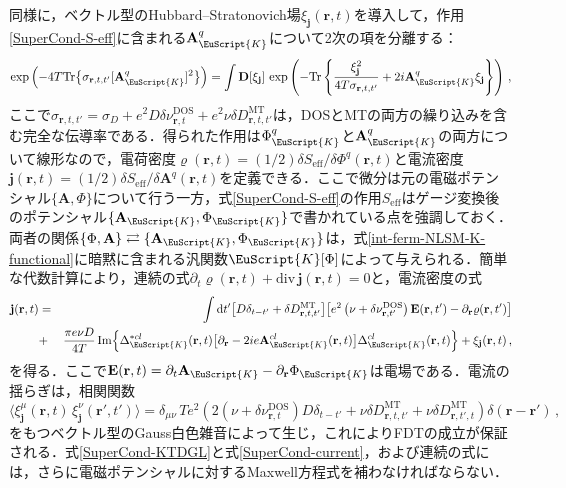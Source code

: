 \documentclass[a4paper,11pt]{ltjsarticle}
\def\Tr{\mathrm{Tr}}
\def\d{\mathrm{d}}
\def\D{\mathbf{D}}
\def\rt{(\mathbf{r},t)}
\begin{document}
同様に，ベクトル型のHubbard--Stratonovich場$\xi_{\mathbf{j}}\rt$を導入して，作用\eqref{SuperCond-S-eff}に含まれる$\mathbf{A}^{q}_{\EuScript{K}}$について2次の項を分離する：
\begin{equation}
\exp\left(-4T\Tr\big\{\sigma_{\mathbf{r},t,t'}
[\mathbf{A}^{q}_{\EuScript{K}}]^{2}\big\}\right)=\int\D[\xi_{\mathbf{j}}]\,
\exp\left(-\Tr\left\{\frac{\xi^{2}_{\mathbf{j}}}{4T\sigma_{\mathbf{r},t,t'}}
+2i\mathbf{A}^{q}_{\EuScript{K}}\xi_{\mathbf{j}}\right\}\right)\,,
\end{equation}
ここで$\sigma_{\mathbf{r},t,t'}=\sigma_{D}+e^{2}D\delta\nu^{\mathrm{DOS}}_{\mathbf{r},t}+e^{2}\nu\delta D^{\mathrm{MT}}_{\mathbf{r},t,t'}$は，DOSとMTの両方の繰り込みを含む完全な伝導率である．得られた作用は$\Phi^{q}_{\EuScript{K}}$と$\mathbf{A}^{q}_{\EuScript{K}}$の両方について線形なので，電荷密度$\varrho\rt=(1/2)\delta S_{\mathrm{eff}}/\delta\Phi^{q}\rt$と電流密度$\mathbf{j}\rt=(1/2)\delta S_{\mathrm{eff}}/\delta\mathbf{A}^{q}\rt$を定義できる．ここで微分は元の電磁ポテンシャル$\{\mathbf{A},\Phi\}$について行う一方，式\eqref{SuperCond-S-eff}の作用$S_{\mathrm{eff}}$はゲージ変換後のポテンシャル$\{\mathbf{A}_{\EuScript{K}},\Phi_{\EuScript{K}}\}$で書かれている点を強調しておく．両者の関係$\{\Phi,\mathbf{A}\}\rightleftarrows\{\mathbf{A}_{\EuScript{K}},\Phi_{\EuScript{K}}\}$は，式\eqref{int-ferm-NLSM-K-functional}に暗黙に含まれる汎関数$\EuScript{K}[\Phi]$によって与えられる．簡単な代数計算により，連続の式$\partial_{t}\varrho\rt+\mathrm{div}\,\mathbf{j}\rt=0$と，電流密度の式
\begin{eqnarray}\label{SuperCond-current}
\mathbf{j}\rt&=&\int\d t'\big[D\delta_{t-t'}+\delta
D^{\mathrm{MT}}_{\mathbf{r},t,t'}\big]\big[e^{2}\left(\nu +
\delta\nu^{\mathrm{DOS}}_{\mathbf{r},t'}\right) \mathbf{E}
(\mathbf{r},t')-\partial_{\mathbf{r}}\varrho(\mathbf{r},t')\big]\nonumber\\
&+&\frac{\pi e\nu D}{4T}\,
\mathrm{Im}\Big\{\Delta^{*cl}_{\EuScript{K}}\rt
\big[\partial_{\mathbf{r}}-2ie\mathbf{A}^{cl}_{\EuScript{K}}\rt\big]
\Delta^{cl}_{\EuScript{K}}\rt\Big\}+\xi_{\mathbf{j}}\rt\,,
\end{eqnarray}
を得る．ここで$\mathbf{E}\rt=\partial_{t}\mathbf{A}_{\EuScript{K}}-\partial_{\mathbf{r}}\Phi_{\EuScript{K}}$は電場である．電流の揺らぎは，相関関数
\begin{equation}\label{SuperCond-xi-j}
\big\langle \xi^{\mu}_{\mathbf{j}}(\mathbf{r},t)\,
\xi^{\nu}_{\mathbf{j}}(\mathbf{r'},t') \big\rangle
=\delta_{\mu\nu}\,T e^2
\left(2(\nu+\delta\nu^{\mathrm{DOS}}_{\mathbf{r},t} )D \delta_{t-t'}
+\nu \delta D^{\mathrm{MT}}_{\mathbf{r},t,t'} + \nu \delta
D^{\mathrm{MT}}_{\mathbf{r},t',t}\right)
\delta(\mathbf{r}-\mathbf{r'})\,,
\end{equation}
をもつベクトル型のGauss白色雑音によって生じ，これによりFDTの成立が保証される．式\eqref{SuperCond-KTDGL}と式\eqref{SuperCond-current}，および連続の式には，さらに電磁ポテンシャルに対するMaxwell方程式を補わなければならない．
\end{document}
